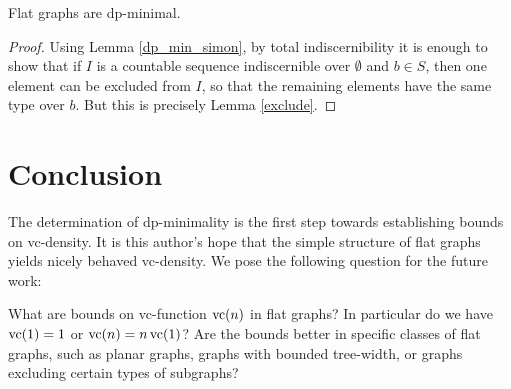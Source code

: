 \begin{Corollary}
  Flat graphs are dp-minimal.
\end{Corollary}
\begin{proof}
  Using Lemma \ref{dp_min_simon}, by total indiscernibility
  it is enough to show that if $I$ is a countable sequence indiscernible over $\emptyset$ and $b \in S$,
  then one element can be excluded from $I$, so that the remaining elements have the same type over $b$.
  But this is precisely Lemma \ref{exclude}.
\end{proof}

\section{Conclusion}
The determination of dp-minimality is the first step towards establishing bounds on vc-density.
It is this author's hope that the simple structure of flat graphs yields nicely behaved vc-density.
We pose the following question for the future work:
\begin{openq}
  What are bounds on vc-function $\operatorname{vc}(n)$ in flat graphs?
  In particular do we have $\operatorname{vc}(1) = 1$ or $\operatorname{vc}(n) = n \operatorname{vc}(1)$?
  Are the bounds better in specific classes of flat graphs,
  such as planar graphs, graphs with bounded tree-width, or graphs excluding certain types of subgraphs?
\end{openq}
